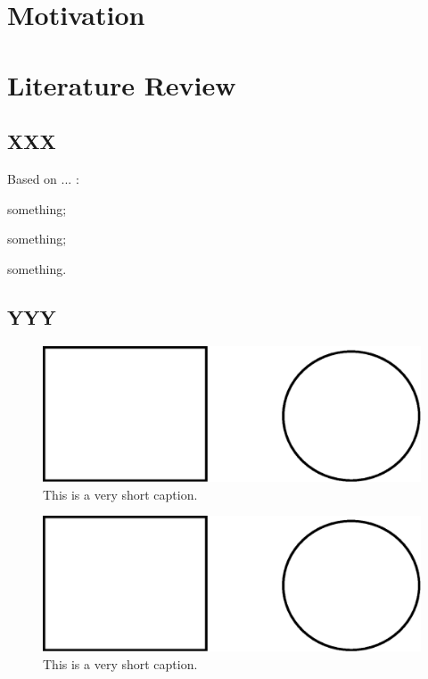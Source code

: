 \section{Motivation}

\lipsum[1-5]

\section{Literature Review}

\subsection{XXX}

Based on ... \cite{khalil2015nonlinear}:
\begin{compactenum}[1.]
	\item something;
	
	\item something;
	
	\item something.
\end{compactenum}

\nocite{*}
\lipsum[6-7]

\subsection{YYY}

\lipsum[8-9]

\begin{figure}[htbp]
	\centering
	\includegraphics[width=0.7\linewidth]{Pics/intro/drawing}
	\caption{This is a very short caption.}
	\label{fig:drawing}
\end{figure}

\begin{figure}[htbp]
	\centering
	\includegraphics[width=0.7\linewidth]{Pics/intro/drawing}
	\caption{This is a very short caption.}
	\label{fig:drawing2}
\end{figure}

